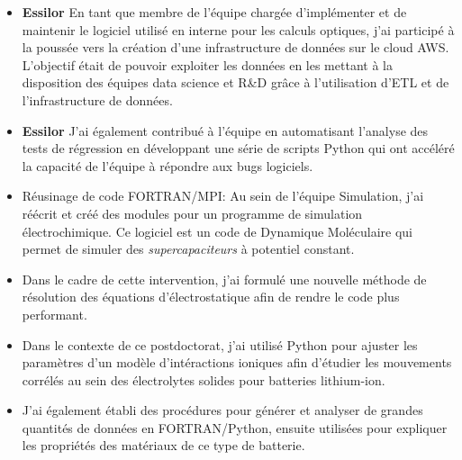 \documentclass[10pt,a4paper,ragged2e,academicons]{altacv}
\begin{document}
\divider

\begin{itemize}
\item \textbf{Essilor} En tant que membre de l'équipe chargée d'implémenter et de maintenir le logiciel utilisé en interne pour les calculs optiques, j'ai participé à la poussée vers la création d'une infrastructure de données sur le cloud AWS. L'objectif était de pouvoir exploiter les données en les mettant à la disposition des équipes data science et R\&D grâce à l'utilisation d'ETL et de l'infrastructure de données.
\item \textbf{Essilor} J'ai également contribué à l'équipe en automatisant l'analyse des tests de régression en développant une série de scripts Python qui ont accéléré la capacité de l'équipe à répondre aux bugs logiciels.
\end{itemize}

\divider

\begin{itemize}
\item Réusinage de code FORTRAN/MPI:
Au sein de l'équipe Simulation, j'ai réécrit et créé des modules pour un programme de simulation électrochimique.  
Ce logiciel est un code de Dynamique Moléculaire qui permet de simuler des \textit{supercapaciteurs} à potentiel constant.
\item Dans le cadre de cette intervention, j'ai formulé une nouvelle méthode de résolution des équations d’électrostatique afin de rendre le code plus performant. 
\end{itemize}

\clearpage
{}

\begin{itemize}
\item Dans le contexte de ce postdoctorat, j'ai utilisé Python pour ajuster les paramètres d'un modèle d'intéractions ioniques afin d'étudier les mouvements corrélés au sein des électrolytes solides pour batteries lithium-ion.
\item J'ai également établi des procédures pour générer et analyser de grandes quantités de données en FORTRAN/Python, ensuite utilisées pour expliquer les propriétés des matériaux de ce type de batterie.
\end{itemize}
\end{document}
